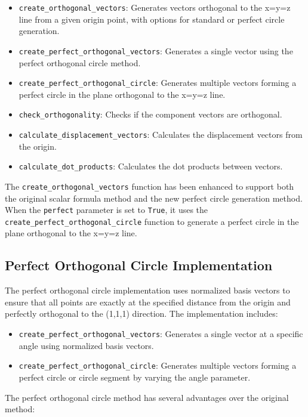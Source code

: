 \begin{itemize}
    \item \texttt{create\_orthogonal\_vectors}: Generates vectors orthogonal to the x=y=z line from a given origin point, with options for standard or perfect circle generation.
    \item \texttt{create\_perfect\_orthogonal\_vectors}: Generates a single vector using the perfect orthogonal circle method.
    \item \texttt{create\_perfect\_orthogonal\_circle}: Generates multiple vectors forming a perfect circle in the plane orthogonal to the x=y=z line.
    \item \texttt{check\_orthogonality}: Checks if the component vectors are orthogonal.
    \item \texttt{calculate\_displacement\_vectors}: Calculates the displacement vectors from the origin.
    \item \texttt{calculate\_dot\_products}: Calculates the dot products between vectors.
\end{itemize}

The \texttt{create\_orthogonal\_vectors} function has been enhanced to support both the original scalar formula method and the new perfect circle generation method. When the \texttt{perfect} parameter is set to \texttt{True}, it uses the \texttt{create\_perfect\_orthogonal\_circle} function to generate a perfect circle in the plane orthogonal to the x=y=z line.

\subsection{Perfect Orthogonal Circle Implementation}

The perfect orthogonal circle implementation uses normalized basis vectors to ensure that all points are exactly at the specified distance from the origin and perfectly orthogonal to the (1,1,1) direction. The implementation includes:

\begin{itemize}
    \item \texttt{create\_perfect\_orthogonal\_vectors}: Generates a single vector at a specific angle using normalized basis vectors.
    \item \texttt{create\_perfect\_orthogonal\_circle}: Generates multiple vectors forming a perfect circle or circle segment by varying the angle parameter.
\end{itemize}

The perfect orthogonal circle method has several advantages over the original method:

